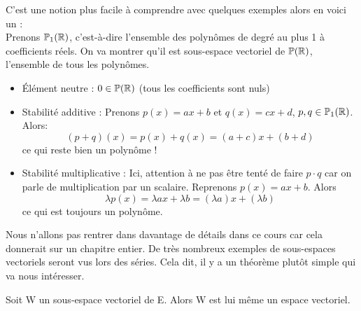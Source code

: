 C'est une notion plus facile à comprendre avec quelques exemples alors en voici un : \\
Prenons $\mathbb{P}_1(\mathbb{R})$, c'est-à-dire l'ensemble des polynômes de degré au plus 1 à coefficients réels. On va montrer qu'il est sous-espace vectoriel de $\mathbb{P}(\mathbb{R})$, l'ensemble de tous les polynômes.
\begin{itemize}
    \item Élément neutre : $0 \in \mathbb{P}(\mathbb{R})$ (tous les coefficients sont nuls)
    \item Stabilité additive : Prenons $p(x) = ax+b$ et $q(x) = cx+d$, $p, q \in \mathbb{P}_1(\mathbb{R})$. Alors: 
    $$(p+q)(x) = p(x)+q(x) = (a+c)x+(b+d)$$
    ce qui reste bien un polynôme !
    \item Stabilité multiplicative : Ici, attention à ne pas être tenté de faire $p\cdot q$ car on parle de multiplication par un scalaire. Reprenons $p(x)=ax+b$. Alors
    $$\lambda p(x) = \lambda ax + \lambda b = (\lambda a)x + (\lambda b)$$
    ce qui est toujours un polynôme. \\
\end{itemize}

Nous n'allons pas rentrer dans davantage de détails dans ce cours car cela donnerait sur un chapitre entier. De très nombreux exemples de sous-espaces vectoriels seront vus lors des séries. Cela dit, il y a un théorème plutôt simple qui va nous intéresser.
\begin{boxthm}
Soit W un sous-espace vectoriel de E. Alors W est lui même un espace vectoriel.
\end{boxthm}